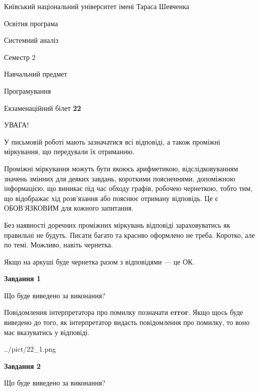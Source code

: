 \documentclass[12pt, ukrainian]{article}
\begin{document}
{{\begin {small}\par
{ \center  Київський національний університет імені Тараса Шевченка \par}
{\parbox {5 cm}{Освітня програма \hfill}{\parbox {7 cm}{Системний аналіз \hfill}}\parbox {6 cm}{\hfill Семестр 2}}\par
{\parbox {5 cm} {Навчальний предмет \hfill}\parbox {7 cm}{Програмування \hfill}\parbox {6cm}{\hfill}\par}\vspace{-7pt} \end{small}}{\center Екзаменаційний білет \No \textbf
{ 22 }\par}}
{
\begin {large}
УВАГА!

У письмовій роботі мають зазначатися всі відповіді, а також проміжні міркування, що передували їх отриманню.

Проміжні міркування можуть бути якоюсь арифметикою, відслідковуванням зна\-чень змінних для деяких завдань,
короткими поясненнями, допоміжною інформацією, що виникає під час обходу графів, робочею чернеткою,
тобто тим, що відображає хід розв’язання або пояснює отриману відповідь.
Це є ОБОВ’ЯЗКОВИМ для кожного запитання.

Без наявності доречних проміжних міркувань відповіді зараховуватись як правиль\-ні не будуть.
Писати багато та красиво оформлено не треба. Коротко, але по темі. Можли\-во, навіть чернетка.

Якщо на аркуші буде чернетка разом з відповідями --- це ОК.

\newpage

{\begin {center}\textbf{Завдання 1}\end {center}}\par
Що буде виведено за виконання?

Повідомлення інтерпретатора про помилку позначати \textbf{error}.
Якщо щось буде виведено до того, як інтерпретатор видасть повідомлення про помилку, 
то воно має вказуватись у відповіді. \par


\begin{center}
	{../pict/22_1.png}
\end{center}
\newpage

{\begin {center}\textbf{Завдання 2}\end {center}}\par
Що буде виведено за виконання?


\end{large}}
\end{document}
